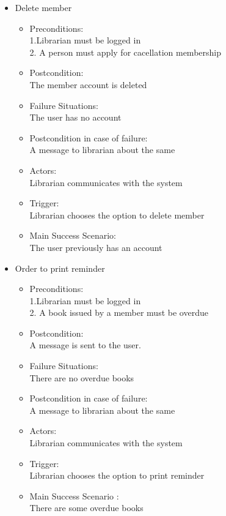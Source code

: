 \documentclass[a4paper]{article}
\begin{document}
\begin{enumerate}
\begin{itemize}
\item Delete member\\ 
 \begin{itemize}
  \item Preconditions:\\ 1.Librarian must be logged in\\ 2. A person must apply for cacellation membership\\ 
 \item Postcondition:\\ The member account is deleted\\ 
 \item Failure Situations: \\ The user has no account\\ 
 \item Postcondition in case of failure:\\ A message to librarian about the same\\ 
 \item Actors: \\ Librarian communicates with the system\\ 
 \item Trigger:\\  Librarian  chooses the option to delete member\\ 
 \item Main Success Scenario:\\  The user   previously has an account\\ 
 \end{itemize}
 
 \item Order to print reminder\\ 
 \begin{itemize}
  \item Preconditions:\\ 1.Librarian must be logged in\\ 2. A book issued by a member must be overdue\\ 
 \item Postcondition:\\ A message is sent to the user.\\ 
 \item Failure Situations:\\  There are no overdue books\\ 
 \item Postcondition in case of failure:\\ A message to librarian about the same\\ 
 \item Actors: \\ Librarian communicates with the system\\ 
 \item Trigger:\\  Librarian  chooses the option to print reminder\\ 
 \item Main Success Scenario :\\  There are some overdue books\\ 
 \end{itemize}


\end{itemize}
\end{enumerate}
\end{document}

